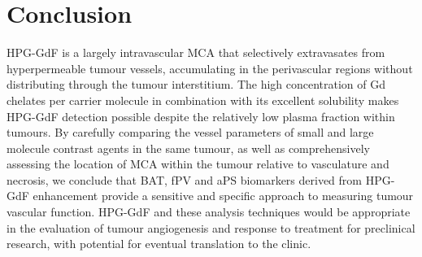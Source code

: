 \section{Conclusion}

HPG-GdF is a largely intravascular MCA that selectively extravasates from hyperpermeable tumour vessels, accumulating in the perivascular regions without distributing through the tumour interstitium.
The high concentration of Gd chelates per carrier molecule in combination with its excellent solubility makes \acs{HPG-GdF} detection possible despite the relatively low plasma fraction within tumours.
By carefully comparing the vessel parameters of small and large molecule contrast agents in the same tumour, as well as comprehensively assessing the location of MCA within the tumour relative to vasculature and necrosis, we conclude that \acs{BAT}, \acs{fPV} and \acs{aPS} biomarkers derived from \acs{HPG-GdF} enhancement provide a sensitive and specific approach to measuring tumour vascular function.
\acs{HPG-GdF} and these analysis techniques would be appropriate in the evaluation of tumour angiogenesis and response to treatment for preclinical research, with potential for eventual translation to the clinic.


\endinput
